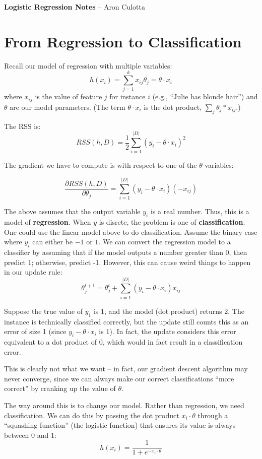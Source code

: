 \documentclass{article}
\begin{document}
\Large{\bf Logistic Regression Notes}  -- Aron Culotta
\normalsize

\section*{From Regression to Classification}
Recall our model of regression with multiple variables:
$$
h(x_i) =  \sum_{j=1}^{k} x_{ij}\theta_j = \theta \cdot  x_i
$$ where $x_{ij}$ is the value of feature $j$ for instance $i$ (e.g.,
``Julie has blonde hair'') and $\theta$ are our model parameters. (The term $\theta \cdot x_i$ is the dot product, $\sum_j \theta_j * x_{ij}$.)

The RSS is:
$$
RSS(h, D) = \frac{1}{2}\sum_{i=1}^{|D|}(y_i - \theta \cdot x_i)^2
$$

The gradient we have to compute is with respect to one of the $\theta$ variables:

$$
\frac{\partial RSS(h, D)}{\partial \theta_j} = \sum_{i=1}^{|D|}(y_i - \theta \cdot x_i)(-x_{ij})
$$

The above assumes that the output variable $y_i$ is a real number. Thus,
this is a model of {\bf regression}. When $y$ is disrete, the
problem is one of {\bf classification}. One could use the linear model
above to do classification. Assume the binary case where $y_i$ can
either be $-1$ or $1$. We can convert the regression model to a
classifier by assuming that if the model outputs a number greater than
0, then predict 1; otherwise, predict -1. However, this can cause
weird things to happen in our update rule:
$$
\theta_j^{t+1} = \theta_j^{t} + \sum_{i=1}^{|D|}(y_i - \theta \cdot x_i)x_{ij}
$$

Suppose the true value of $y_1$ is $1$, and the model (dot product)
returns 2. The instance is technically classified correctly, but the update still counts this as an error of size 1 (since $y_i -\theta \cdot x_i$ is 1). In fact, the update considers this error equivalent to a dot product of $0$, which would in fact result in a classification error.

This is clearly not what we want -- in fact, our gradient descent algorithm may never converge, since we can always make our correct classifications ``more correct'' by cranking up the value of $\theta$.

The way around this is to change our model. Rather than regression, we need classification. We can do this by passing the dot product $x_i \cdot \theta$ through a ``squashing function'' (the logistic function) that ensures its value is always between 0 and 1:
$$
h(x_i) = \frac{1}{1 + e^{-x_i \cdot \theta}}
$$
\end{document}
